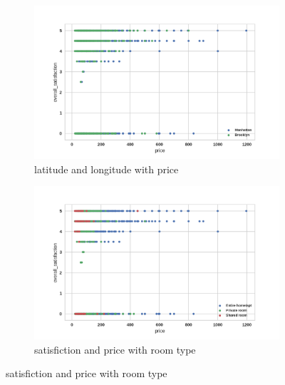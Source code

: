 \documentclass[12pt]{article}
\begin{document}
\begin{figure}
    \begin{subfigure}[b]{0.45\textwidth}
        \includegraphics[width=\textwidth]{images/pair-over-price1.png}
        \caption{latitude and longitude with price}
        \label{fig:pair-bedrooms-price}
    \end{subfigure}
    \begin{subfigure}[b]{0.45\textwidth}
        \includegraphics[width=\textwidth]{images/pair-over-price2.png}
        \caption{ satisfiction and price with room type}
        \label{fig:pair-over-price2}
    \end{subfigure}
    

\end{figure}
\end{document}
